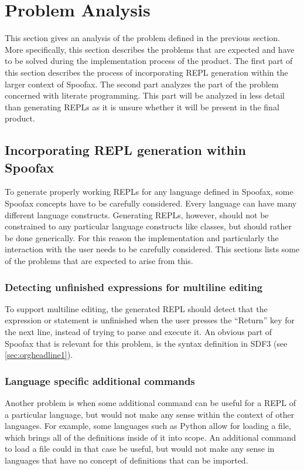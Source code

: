 \section{Problem Analysis}
\label{sec:problem-analysis}
This section gives an analysis of the problem defined in the previous
section. More specifically, this section describes the problems that
are expected and have to be solved during the implementation process
of the product. The first part of this section describes the process
of incorporating REPL generation within the larger context of
Spoofax. The second part analyzes the part of the problem concerned
with literate programming. This part will be analyzed in less detail
than generating REPLs as it is unsure whether it will be present in
the final product.

\subsection{Incorporating REPL generation within Spoofax}
\label{ssec:incorp-repl-gener}
To generate properly working REPLs for any language defined in
Spoofax, some Spoofax concepts have to be carefully considered. Every
language can have many different language constructs. Generating
REPLs, however, should not be constrained to any particular language
constructs like classes, but should rather be done generically. For
this reason the implementation and particularly the interaction with
the user needs to be carefully considered. This sections lists some of
the problems that are expected to arise from this.

\subsubsection{Detecting unfinished expressions for multiline editing}
\label{sec:detect-unfin-expr}
To support multiline editing, the generated REPL should detect that
the expression or statement is unfinished when the user presses the
``Return'' key for the next line, instead of trying to parse and
execute it. An obvious part of Spoofax that is relevant for this
problem, is the syntax definition in SDF3 (see
\cref{sec:orgheadline1}).

\subsubsection{Language specific additional commands}
\label{sec:lang-spec-addit}
Another problem is when some additional command can be useful for a
REPL of a particular language, but would not make any sense within the
context of other languages. For example, some languages such as Python
allow for loading a file, which brings all of the definitions inside
of it into scope. An additional command to load a file could in that
case be useful, but would not make any sense in languages that have no
concept of definitions that can be imported.

